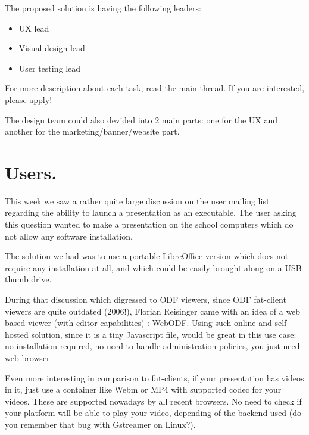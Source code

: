 \documentclass{article}
\begin{document}
The proposed solution is having the following leaders:
\begin{itemize}
    \item UX lead
    \item Visual design lead
    \item User testing lead
\end{itemize}

For more description about each task, read the main thread\cite{reorganisation}. If you are interested, please apply!

The design team could also devided into 2 main parts: one for the UX and another for the marketing/banner/website part\cite{reorganisationSplit}.



\section{Users.}

This week we saw a rather quite large discussion on the user mailing list regarding the ability to launch a presentation as an executable. The user asking this question wanted to make a presentation on the school computers which do not allow any software installation.

The solution we had was to use a portable LibreOffice version\cite{liboPortable} which does not require any installation at all, and which could be easily brought along on a USB thumb drive.

During that discussion which digressed to ODF viewers, since ODF fat-client\cite{fatClient} viewers\cite{odfViewers} are quite outdated (2006!)\cite{odfViewersOutdated}, Florian Reisinger came with an idea of a web based viewer (with editor capabilities) : WebODF. Using such online and self-hosted solution, since it is a tiny Javascript file, would be great in this use case: no installation required, no need to handle administration policies, you just need web browser.

Even more interesting in comparison to fat-clients, if your presentation has videos in it, just use a container like Webm or MP4 with supported codec for your videos. These are supported nowadays by all recent browsers. No need to check if your platform will be able to play your video, depending of the backend used (do you remember that bug with Gstreamer on Linux?\cite{impressVideoBug,impressVideoBug2}).
\end{document}
